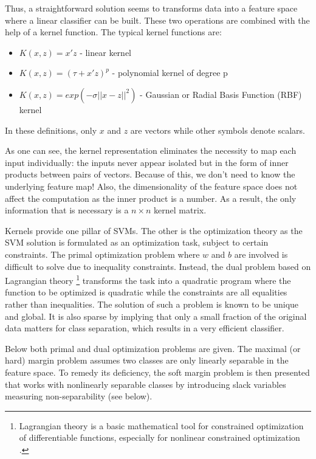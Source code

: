Thus, a straightforward solution seems to transforms data into a feature space where a linear classifier can be built. These two operations are combined with the help of a kernel function. The typical kernel functions are:
\begin{itemize}
            \item \(K(x,z) = x'z \) - linear kernel
            \item \(K(x,z) = (\tau + x'z)^p\) - polynomial kernel of degree p
            \item \(K(x,z) = exp(-\sigma||x-z||^2)\) - Gaussian or Radial Basis Function (RBF) kernel
\end{itemize}

In these definitions, only $x$ and $z$ are vectors while other symbols denote scalars.

As one can see, the kernel representation eliminates the necessity to map each input individually: the inputs never appear isolated but in the form of inner products between pairs of vectors. Because of this, we don't need to know the underlying feature map! Also, the dimensionality of the feature space does not affect the computation as the inner product is a number. As a result, the only information that is necessary is a \(n\times n\) kernel matrix.

Kernels provide one pillar of SVMs. The other is the optimization theory as the SVM solution is formulated as an optimization task, subject to certain constraints. The primal optimization problem where \( w \) and \( b \) are involved is difficult to solve due to inequality constraints. Instead, the dual problem based on  Lagrangian theory \footnote{Lagrangian theory is a basic mathematical tool for constrained optimization of differentiable functions, especially for nonlinear constrained optimization \cite{Li:2008}.} transforms the task into a quadratic program where the function to be optimized is quadratic while the constraints are all equalities rather than inequalities. The solution of such a problem is known to be unique and global. It is also sparse by implying that only a small fraction of the original data matters for class separation, which results in a very efficient classifier.

Below both primal and dual optimization problems are given. The maximal (or hard) margin problem assumes two classes are only linearly separable in the feature space. To remedy its deficiency, the soft margin problem is then presented that works with nonlinearly separable classes by introducing slack variables measuring non-separability (see below).

